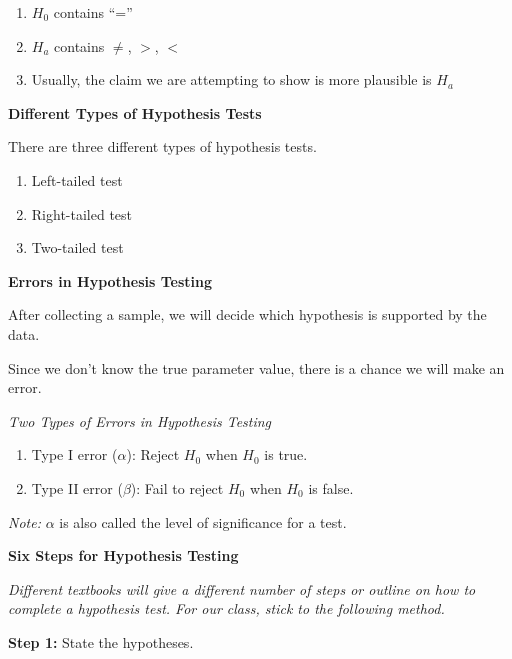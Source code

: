 \documentclass[
  11pt,
]{book}
\providecommand{\tightlist}{%
  \setlength{\itemsep}{0pt}\setlength{\parskip}{0pt}}
\theoremstyle{definition}
\theoremstyle{definition}
\theoremstyle{definition}
\theoremstyle{definition}
\theoremstyle{remark}
\begin{document}
\begin{enumerate}
\def\labelenumi{\arabic{enumi}.}
\tightlist
\item
  \(H_0\) contains ``=''\\
\item
  \(H_a\) contains \(\neq\), \(>\), \(<\)\\
\item
  Usually, the claim we are attempting to show is more plausible is \(H_a\)
\end{enumerate}

\textbf{Different Types of Hypothesis Tests}

There are three different types of hypothesis tests.

\begin{enumerate}
\def\labelenumi{\arabic{enumi}.}
\item
  Left-tailed test ~\vfill
\item
  Right-tailed test ~\vfill
\item
  Two-tailed test ~\vfill
\end{enumerate}

\textbf{Errors in Hypothesis Testing}

After collecting a sample, we will decide which hypothesis is supported by the data.

Since we don't know the true parameter value, there is a chance we will make an error.

\emph{Two Types of Errors in Hypothesis Testing}

\begin{enumerate}
\def\labelenumi{\arabic{enumi}.}
\tightlist
\item
  Type I error (\(\alpha\)): Reject \(H_0\) when \(H_0\) is true.\\
\item
  Type II error (\(\beta\)): Fail to reject \(H_0\) when \(H_0\) is false.
\end{enumerate}

\emph{Note:} \(\alpha\) is also called the level of significance for a test.

\newpage

\textbf{Six Steps for Hypothesis Testing}

\emph{Different textbooks will give a different number of steps or outline on how to complete a hypothesis test. For our class, stick to the following method.}

\textbf{Step 1:} State the hypotheses.\\
\vfill
\end{document}
